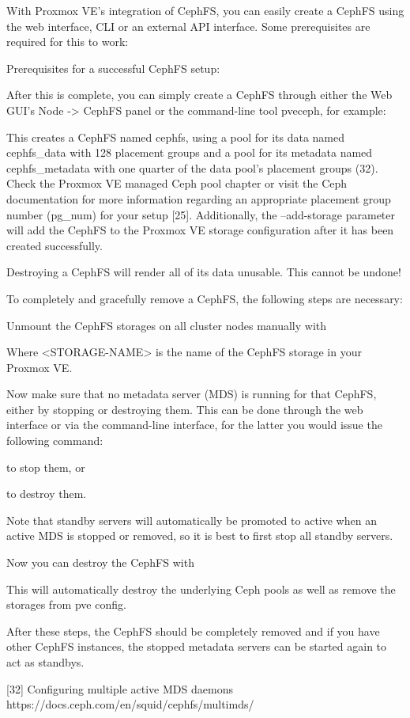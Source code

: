 With Proxmox VE’s integration of CephFS, you can easily create a CephFS using the web interface, CLI or an external API interface. Some prerequisites are required for this to work:

Prerequisites for a successful CephFS setup:

After this is complete, you can simply create a CephFS through either the Web GUI’s Node -> CephFS panel or the command-line tool pveceph, for example:

This creates a CephFS named cephfs, using a pool for its data named cephfs_data with 128 placement groups and a pool for its metadata named cephfs_metadata with one quarter of the data pool’s placement groups (32). Check the Proxmox VE managed Ceph pool chapter or visit the Ceph documentation for more information regarding an appropriate placement group number (pg_num) for your setup [25]. Additionally, the --add-storage parameter will add the CephFS to the Proxmox VE storage configuration after it has been created successfully.

Destroying a CephFS will render all of its data unusable. This cannot be undone!

To completely and gracefully remove a CephFS, the following steps are necessary:

Unmount the CephFS storages on all cluster nodes manually with

Where <STORAGE-NAME> is the name of the CephFS storage in your Proxmox VE.

Now make sure that no metadata server (MDS) is running for that CephFS, either by stopping or destroying them. This can be done through the web interface or via the command-line interface, for the latter you would issue the following command:

to stop them, or

to destroy them.

Note that standby servers will automatically be promoted to active when an active MDS is stopped or removed, so it is best to first stop all standby servers.

Now you can destroy the CephFS with

This will automatically destroy the underlying Ceph pools as well as remove the storages from pve config.

After these steps, the CephFS should be completely removed and if you have other CephFS instances, the stopped metadata servers can be started again to act as standbys.

[32] Configuring multiple active MDS daemons https://docs.ceph.com/en/squid/cephfs/multimds/

